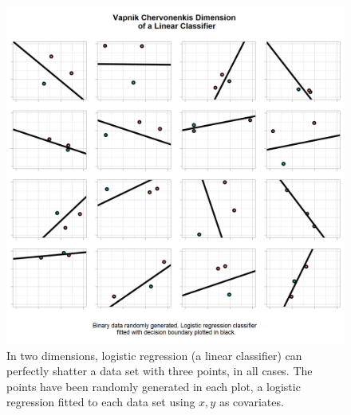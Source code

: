 \begin{figure}[H]
    \centering
    \includegraphics[width=120mm]{figs/vc_3.png}
    \caption[\Gls{vc} dimension of a linear classifier - the data is shattered.]{In two dimensions, logistic regression (a linear classifier) can perfectly shatter a data set with three points, in all cases. The points have been randomly generated in each plot, a logistic regression fitted to each data set using $x, y$ as covariates.}
    \label{fig:vc_3}
\end{figure}

